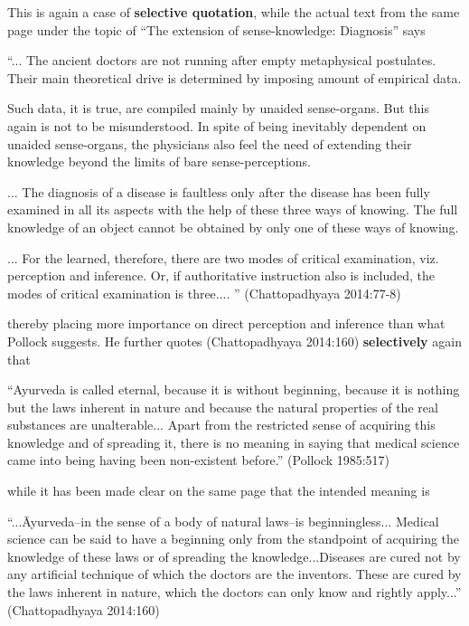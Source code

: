 This is again a case of {\bf selective quotation},  while the actual text from the same page under the topic of ``The extension of sense-knowledge: Diagnosis'' says 
\begin{myquote}
``... The ancient doctors are not running after empty metaphysical postulates. Their main theoretical drive is determined by imposing amount of empirical data. 

Such data, it is true, are compiled mainly by unaided sense-organs. But this again is not to be misunderstood. In spite of being inevitably dependent on unaided sense-organs, the physicians also feel the need of extending their knowledge beyond the limits of bare sense-perceptions.

... The diagnosis of a disease is faultless only after the disease has been fully examined in all its aspects with the help of these three ways of knowing. The full knowledge of an object cannot be obtained by only one of these ways of knowing.

... For the learned, therefore, there are two modes of critical examination, viz. perception and inference. Or, if authoritative instruction also is included, the modes of critical examination is three.... '' (Chattopadhyaya 2014:77-8)
\end{myquote}
thereby placing more importance on direct perception and inference than what Pollock suggests. He further quotes (Chattopadhyaya 2014:160) {\bf selectively} again that 
\begin{myquote}
``Ayurveda is called eternal, because it is without beginning, because it is nothing but the laws inherent in nature and because the natural properties of the real substances are unalterable... Apart from the restricted sense of acquiring this knowledge and of spreading it, there is no meaning in saying that medical science came into being having been non-existent before.'' (Pollock 1985:517)
\end{myquote}
while it has been made clear on the same page that the intended meaning is

\newpage

\begin{myquote}
``...Āyurveda--in the sense of a body of natural laws--is beginningless... Medical science can be said to have a beginning only from the standpoint of acquiring the knowledge of these laws or of spreading the knowledge...Diseases are cured not by any artiﬁcial technique of which the doctors are the inventors. These are cured by the laws inherent in nature, which the doctors can only know and rightly apply...'' (Chattopadhyaya 2014:160)
\end{myquote}

